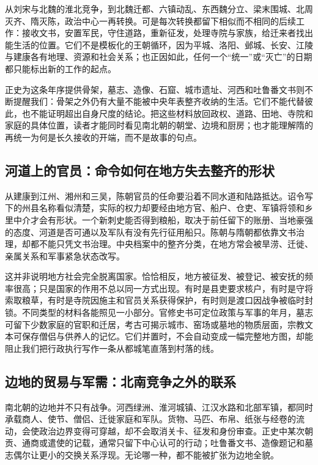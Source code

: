 从刘宋与北魏的淮北竞争，到北魏迁都、六镇动乱、东西魏分立、梁末围城、北周灭齐、隋灭陈，政治中心一再转换。可是每次转换都留下相似而不相同的后续工作：接收文书，安置军民，守住道路，重新征发，处理寺院与家族，给迁来者找出能生活的位置。它们不是模板化的王朝循环，因为平城、洛阳、邺城、长安、江陵与建康各有地理、资源和社会关系；也正因如此，任何一个“统一”或“灭亡”的日期都只能标出新的工作的起点。

正史为这条年序提供骨架，墓志、造像、石窟、城市遗址、河西和吐鲁番文书则不断提醒我们：骨架之外仍有大量不能被中央年表整齐收纳的生活。它们不能代替彼此，也不能证明超出自身尺度的结论。把这些材料放回政权、道路、田地、寺院和家庭的具体位置，读者才能同时看见南北朝的朝堂、边境和厨房；也才能理解隋的再统一为何是长久接收的开端，而不是故事的句点。

\subsection{河道上的官员：命令如何在地方失去整齐的形状}

从建康到江州、湘州和三吴，陈朝官员的任命要沿着不同水道和陆路抵达。诏令写下的州县名称看似清楚，实际的权力却要经由地方官、船户、仓吏、军镇将领和乡里中介才会有形状。一个新刺史能否得到粮船，取决于前任留下的账册、当地豪强的态度、河道是否可通以及军队有没有先行征用船只。陈朝与隋朝都依靠文书治理，却都不能只凭文书治理。中央档案中的整齐分类，在地方常会被旱涝、迁徙、亲属关系和军事紧急状态改写。

这并非说明地方社会完全脱离国家。恰恰相反，地方被征发、被登记、被安抚的频率很高；只是国家的作用不总以同一方式出现。有时是县吏要求核户，有时是守将索取粮草，有时是寺院因施主和官员关系获得保护，有时则是渡口因战争被临时封锁。不同类型的材料各能照见一小部分。官修史书可定位政策与军事的年月，墓志可留下少数家庭的官职和迁居，考古可揭示城市、窑场或墓地的物质层面，宗教文本可保存僧侣与供养人的记忆。它们并置时，不会自动变成一幅完整地方图，却能阻止我们把行政执行写作一条从都城笔直落到村落的线。

\subsection{边地的贸易与军需：北南竞争之外的联系}

南北朝的边地并不只有战争。河西绿洲、淮河城镇、江汉水路和北部军镇，都同时承载商人、使节、僧侣、迁徙家庭和军队。货物、马匹、布帛、纸张与经卷的流动，会使政治边界变得可穿越，却不会取消关卡、征发和身份审查。正史中某次朝贡、通商或遣使的记载，通常只留下中心认可的行动；吐鲁番文书、造像题记和墓志偶尔让更小的交换关系浮现。无论哪一种，都不能被扩张为边地全貌。

